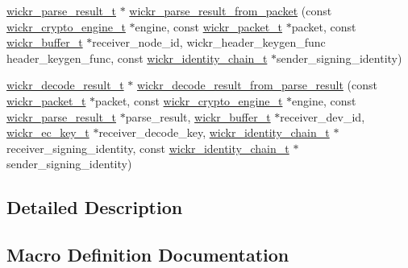 \begin{DoxyCompactItemize}
\item 
\hyperlink{structwickr__parse__result}{wickr\+\_\+parse\+\_\+result\+\_\+t} $\ast$ \hyperlink{group__wickr__protocol_ga1654ef299f9189b27e5e58485f1ffcf5}{wickr\+\_\+parse\+\_\+result\+\_\+from\+\_\+packet} (const \hyperlink{structwickr__crypto__engine}{wickr\+\_\+crypto\+\_\+engine\+\_\+t} $\ast$engine, const \hyperlink{structwickr__packet}{wickr\+\_\+packet\+\_\+t} $\ast$packet, const \hyperlink{structwickr__buffer}{wickr\+\_\+buffer\+\_\+t} $\ast$receiver\+\_\+node\+\_\+id, wickr\+\_\+header\+\_\+keygen\+\_\+func header\+\_\+keygen\+\_\+func, const \hyperlink{structwickr__identity__chain}{wickr\+\_\+identity\+\_\+chain\+\_\+t} $\ast$sender\+\_\+signing\+\_\+identity)
\item 
\hyperlink{structwickr__decode__result}{wickr\+\_\+decode\+\_\+result\+\_\+t} $\ast$ \hyperlink{group__wickr__protocol_ga32d9da2e10d1d653b2ac894d50aaedb0}{wickr\+\_\+decode\+\_\+result\+\_\+from\+\_\+parse\+\_\+result} (const \hyperlink{structwickr__packet}{wickr\+\_\+packet\+\_\+t} $\ast$packet, const \hyperlink{structwickr__crypto__engine}{wickr\+\_\+crypto\+\_\+engine\+\_\+t} $\ast$engine, const \hyperlink{structwickr__parse__result}{wickr\+\_\+parse\+\_\+result\+\_\+t} $\ast$parse\+\_\+result, \hyperlink{structwickr__buffer}{wickr\+\_\+buffer\+\_\+t} $\ast$receiver\+\_\+dev\+\_\+id, \hyperlink{structwickr__ec__key}{wickr\+\_\+ec\+\_\+key\+\_\+t} $\ast$receiver\+\_\+decode\+\_\+key, \hyperlink{structwickr__identity__chain}{wickr\+\_\+identity\+\_\+chain\+\_\+t} $\ast$receiver\+\_\+signing\+\_\+identity, const \hyperlink{structwickr__identity__chain}{wickr\+\_\+identity\+\_\+chain\+\_\+t} $\ast$sender\+\_\+signing\+\_\+identity)
\end{DoxyCompactItemize}


\subsection{Detailed Description}


\subsection{Macro Definition Documentation}
\mbox{\label{group__wickr__protocol_ga89ff9f93c5494db53d3ff27353989862}} 
